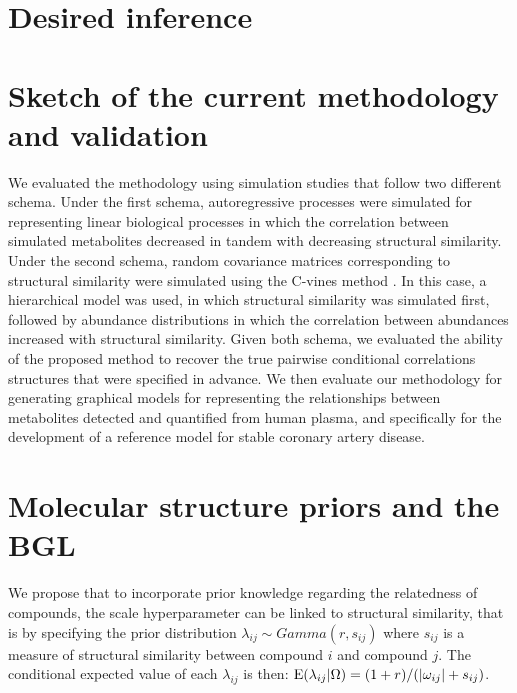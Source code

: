 \section{Desired inference}

\section{Sketch of the current methodology and validation}
We evaluated the methodology using simulation studies that follow two different schema. Under the first schema, autoregressive processes were simulated for representing linear biological processes in which the correlation between simulated metabolites decreased in tandem with decreasing structural similarity. Under the second schema, random covariance matrices corresponding to structural similarity were simulated using the C-vines method \cite{lewandowski2009}. In this case, a hierarchical model was used, in which structural similarity was simulated first, followed by abundance distributions in which the correlation between abundances increased with structural similarity. Given both schema, we evaluated the ability of the proposed method to recover the true pairwise conditional correlations structures that were specified in advance. We then evaluate our methodology for generating graphical models for representing the relationships between metabolites detected and quantified from human plasma, and specifically for the development of a reference model for stable coronary artery disease.  

\section{Molecular structure priors and the BGL}
We propose that to incorporate prior knowledge regarding the relatedness of compounds, the scale hyperparameter can be linked to structural similarity, that is by specifying the prior distribution $\lambda_{ij}\sim Gamma(r,s_{ij})$ where $s_{ij}$ is a measure of structural similarity between compound $i$ and compound $j$. The conditional expected value of each $\lambda_{ij}$ is then: $\operatorname{E}(\lambda_{ij}|\Omega)=(1+r)/(|\omega_{ij} |+s_{ij})$.

